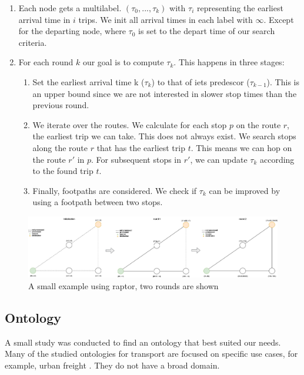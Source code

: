\begin{enumerate}
    \item Each node gets a multilabel. $(\tau_0,...,\tau_k)$ with $\tau_i$ representing the earliest arrival time in $i$ trips. We init all arrival times in each label with $\infty$. Except for the departing node, where $\tau_0$ is set to the depart time of our search criteria.
    \item For each round $k$ our goal is to compute $\tau_k$. This happens in three stages:\begin{enumerate}
        \item Set the earliest arrival time k ($\tau_k$) to that of iets predescor ($\tau_{k-1}$). This is an upper bound since we are not interested in slower stop times than the previous round.
        \item We iterate over the routes. We calculate for each stop $p$ on the route $r$, the earliest trip we can take. This does not always exist. We search stops along the route $r$ that has the earliest trip $t$. This means we can hop on the route $r'$ in $p$. For subsequent stops in $r'$, we can update $\tau_k$ according to the found trip $t$.
        \item Finally, footpaths are considered. We check if $\tau_k$ can be improved by using a footpath between two stops. 
    \end{enumerate}
\end{enumerate}

\begin{figure}[H]
    \centering
    \includegraphics[width=\textwidth]{images/rqptor.drawio.png}
    \caption{A small example using raptor, two rounds are shown }
    \label{fig:enter-label}
\end{figure}

\subsection{Ontology}

A small study was conducted to find an ontology that best suited our needs. Many of the studied ontologies for transport are focused on specific use cases, for example, urban freight \cite{BOUHANA20153724}. They do not have a broad domain. 

